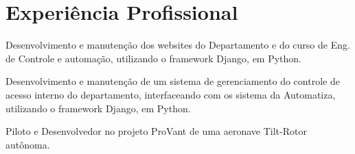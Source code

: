 \documentclass[letterpaper]{deedy-resume} %
\begin{document}
\begin{minipage}[t]{0.66\textwidth} %




\section{Experiência Profissional}

\vspace{\topsep} %
\begin{tightitemize}
 \item Desenvolvimento e manutenção dos websites do Departamento e do curso de Eng. de Controle e automação, utilizando o framework Django, em Python.
\end{tightitemize}

\sectionspace %

\vspace{\topsep} %
\begin{tightitemize}
 \item Desenvolvimento e manutenção de um sistema de gerenciamento do controle de acesso interno do departamento, interfaceando com os sistema da Automatiza, utilizando o framework Django, em Python.
\end{tightitemize}

\sectionspace %


\vspace{\topsep} %
\begin{tightitemize}
 \item Piloto e Desenvolvedor no projeto ProVant de uma aeronave Tilt-Rotor autônoma.
\end{tightitemize}


\sectionspace %



\end{minipage}
\end{document}
